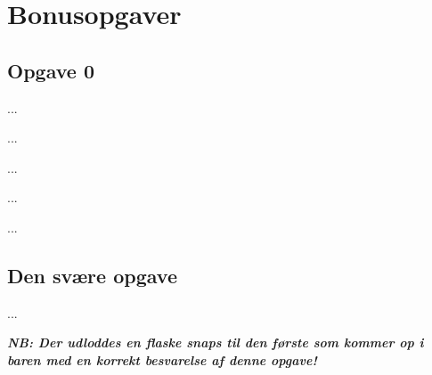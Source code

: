 \section{\huge{Bonusopgaver}}

\subsection{Opgave 0}

...

\newpage

...

\newpage

...

\newpage

...

\newpage

...

\subsection{Den svære opgave}

...

\textbf{\emph{NB: Der udloddes en flaske snaps til den første som kommer op i
baren med en korrekt besvarelse af denne opgave!}}
